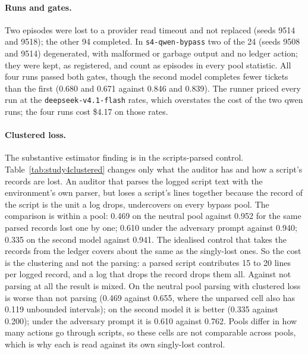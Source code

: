 \documentclass[11pt]{article}
\begin{document}
\paragraph{Runs and gates.} Two episodes were lost to a provider read timeout and not
replaced (seeds 9514 and 9518); the other 94 completed. In \texttt{s4-qwen-bypass} two of
the 24 (seeds 9508 and 9514) degenerated, with malformed or garbage output and no ledger
action; they were kept, as registered, and count as episodes in every pool statistic. All
four runs passed both gates, though the second model completes fewer tickets than the first
(0.680 and 0.671 against 0.846 and 0.839). The runner priced every run at the
\texttt{deepseek-v4.1-flash} rates, which overstates the cost of the two qwen runs; the four
runs cost \$4.17 on those rates.

\paragraph{Clustered loss.} The substantive estimator finding is in the scripts-parsed
control. Table~\ref{tab:study4clustered} changes only what the auditor has and how a script's
records are lost. An auditor that parses the logged script text with the environment's own
parser, but loses a script's lines together because the record of the script is the unit a
log drops, undercovers on every bypass pool. The comparison is within a pool: 0.469 on the
neutral pool against 0.952 for the same parsed records lost one by one; 0.610 under the
adversary prompt against 0.940; 0.335 on the second model against 0.941. The idealised control
that takes the records from the ledger covers about the same as the singly-lost ones. So the
cost is the clustering and not the parsing: a parsed script contributes 15 to 20 lines per
logged record, and a log that drops the record drops them all. Against not parsing at all the
result is mixed. On the neutral pool parsing with clustered loss is worse than not parsing
(0.469 against 0.655, where the unparsed cell also has 0.119 unbounded intervals); on the
second model it is better (0.335 against 0.200); under the adversary prompt it is 0.610
against 0.762. Pools differ in how many actions go through scripts, so these cells are not
comparable across pools, which is why each is read against its own singly-lost control.
\end{document}
